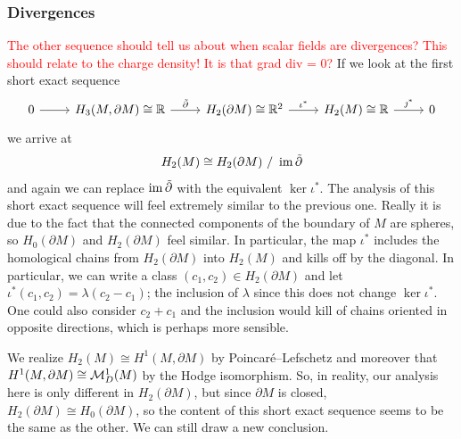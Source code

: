 \documentclass{article}
\begin{document}
\subsubsection{Divergences}
\textcolor{red}{The other sequence should tell us about when scalar fields are divergences? This should relate to the charge density! It is that grad div = 0?}
If we look at the first short exact sequence
\[
\begin{tikzcd}
0 \arrow[r] & {H_3(M,\partial M)\cong \mathbb{R}} \arrow[r, "\tilde{\partial}"] & H_2(\partial M)\cong \mathbb{R}^2 \arrow[r, "\iota^*"] & H_2(M)\cong \mathbb{R} \arrow[r, "\jmath^*"] & 0
\end{tikzcd}
\]
we arrive at 
\begin{equation}
    H_2(M) \cong H_2(\partial M) ~/~ \operatorname{im} \tilde{\partial}
\end{equation}
and again we can replace $\operatorname{im} \tilde{\partial}$ with the equivalent $\ker \iota^*$. The analysis of this short exact sequence will feel extremely similar to the previous one. Really it is due to the fact that the connected components of the boundary of $M$ are spheres, so $H_0(\partial M)$ and $H_2(\partial M)$ feel similar. In particular, the map $\iota^*$ includes the homological chains from $H_2(\partial M)$ into $H_2(M)$ and kills off by the diagonal. In particular, we can write a class $(c_1,c_2) \in H_2(\partial M)$ and let $\iota^*(c_1,c_2)=\lambda (c_2-c_1)$; the inclusion of $\lambda$ since this does not change $\ker \iota^*$. One could also consider $c_2+c_1$ and the inclusion would kill of chains oriented in opposite directions, which is perhaps more sensible.

We realize $H_2(M)\cong H^1(M,\partial M)$ by Poincar\'e--Lefschetz and moreover that $H^1(M,\partial M)\cong \mathcal{M}^1_D(M)$ by the Hodge isomorphism. So, in reality, our analysis here is only different in $H_2(\partial M)$, but since $\partial M$ is closed, $H_2(\partial M)\cong H_0(\partial M)$, so the content of this short exact sequence seems to be the same as the other. We can still draw a new conclusion.
\end{document}
